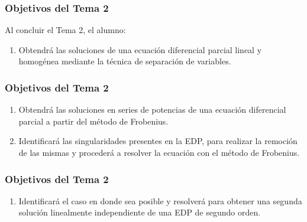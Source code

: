 \documentclass[12pt]{beamer}
\begin{document}
\begin{frame}
\frametitle{Objetivos del Tema 2}
Al concluir el Tema 2, el alumno:
\begin{enumerate}[<+->]
\item Obtendrá las soluciones de una ecuación diferencial parcial lineal y homogénea mediante la técnica de separación de variables.
\seti
\end{enumerate}
\end{frame}
\begin{frame}
\frametitle{Objetivos del Tema 2}
\begin{enumerate}[<+->]
\conti
\item Obtendrá las soluciones en series de potencias de una ecuación diferencial parcial a partir del método de Frobenius.
\item Identificará las singularidades presentes en la EDP, para realizar la remoción de las mismas y procederá a resolver la ecuación con el método de Frobenius.
\seti
\end{enumerate}
\end{frame}
\begin{frame}
\frametitle{Objetivos del Tema 2}
\begin{enumerate}[<+->]
\conti
\item Identificará el caso en donde sea posible y resolverá para obtener una segunda solución linealmente independiente de una EDP de segundo orden.
\seti
\end{enumerate}
\end{frame}
\end{document}
